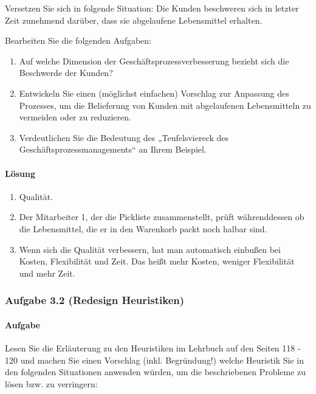     Versetzen Sie sich in folgende Situation: Die Kunden beschweren sich in letzter Zeit zunehmend darüber, dass sie abgelaufene Lebensmittel erhalten.

    Bearbeiten Sie die folgenden Aufgaben:
    \begin{enumerate}[label=\alph*)]
        \item Auf welche Dimension der Geschäftsprozessverbesserung bezieht sich die Beschwerde der Kunden?
        \item Entwickeln Sie einen (möglichst einfachen) Vorschlag zur Anpassung des Prozesses, um die Belieferung von Kunden mit abgelaufenen Lebensmitteln zu vermeiden oder zu reduzieren.
        \item Verdeutlichen Sie die Bedeutung des „Teufelsviereck des Geschäftsprozessmanagements“ an Ihrem Beispiel.
    \end{enumerate}
\paragraph*{Lösung}
    \begin{enumerate}[label=\alph*)]
        \item Qualität.
        \item Der Mitarbeiter 1, der die Pickliste zusammenstellt, prüft währenddessen ob die Lebensmittel, die er in den Warenkorb packt noch halbar sind.
        \item Wenn sich die Qualität verbessern, hat man automatisch einbußen bei Kosten, Flexibilität und Zeit. Das heißt mehr Kosten, weniger Flexibilität und mehr Zeit.
    \end{enumerate}


\subsubsection*{Aufgabe 3.2 (Redesign Heuristiken)}
\paragraph*{Aufgabe}
    Lesen Sie die Erläuterung zu den Heuristiken im Lehrbuch auf den Seiten 118 - 120 und machen Sie einen Vorschlag (inkl. Begründung!) welche Heuristik Sie in den folgenden Situationen anwenden würden, um die beschriebenen Probleme zu lösen bzw. zu verringern:
    
